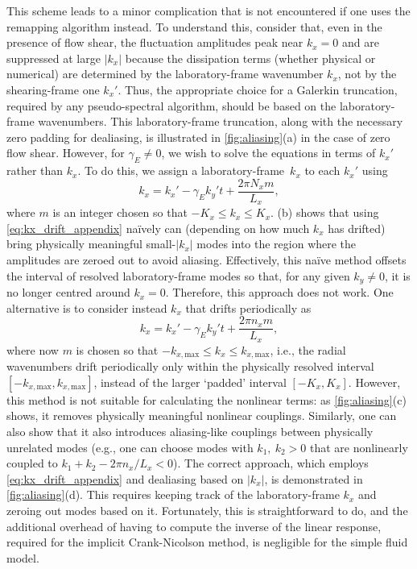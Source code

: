 \documentclass{jpp}
\newcommand{\gammaE}{\gamma_{E}}
\begin{document}
This scheme leads to a minor complication that is not encountered if one uses the remapping algorithm instead. To understand this, consider that, even in the presence of flow shear, the fluctuation amplitudes peak near \(k_x = 0\) and are suppressed at large \(|k_x|\) because the dissipation terms (whether physical or numerical) are determined by the laboratory-frame wavenumber \(k_x\), not by the shearing-frame one \(k_x'\). Thus, the appropriate choice for a Galerkin truncation, required by any pseudo-spectral algorithm, should be based on the laboratory-frame wavenumbers. This laboratory-frame truncation, along with the necessary zero padding for dealiasing, is illustrated in \cref{fig:aliasing}(a) in the case of zero flow shear. However, for \(\gammaE \neq 0\), we wish to solve the equations in terms of \(k_x'\) rather than \(k_x\). To do this, we assign a laboratory-frame~\(k_x\) to each \(k_x'\) using
\begin{equation}
	k_x = k_x' - \gammaE k_y' t + \frac{2\pi N_x m}{L_x},
	\label{eq:kx_drift_appendix}
\end{equation}
where \(m\) is an integer chosen so that \(-K_x \leq k_x \leq K_x\). (b) shows that using \cref{eq:kx_drift_appendix} na\"ively can (depending on how much \(k_x\) has drifted) bring physically meaningful small-\(|k_x|\) modes into the region where the amplitudes are zeroed out to avoid aliasing. Effectively, this na\"ive method offsets the interval of resolved laboratory-frame modes so that, for any given \(k_y \neq 0\), it is no longer centred around \(k_x = 0\). Therefore, this approach does not work. One alternative is to consider instead \(k_x\) that drifts periodically as
\begin{equation}
	k_x = k_x' - \gammaE k_y' t + \frac{2\pi n_x m}{L_x},
	\label{eq:kx_drift_appendix_smallerperiod}
\end{equation}
where now \(m\) is chosen so that \mbox{\(-k_{x, \text{max}} \leq k_x \leq k_{x, \text{max}}\)}, i.e., the radial wavenumbers drift periodically only within the physically resolved interval \([-k_{x, \text{max}}, k_{x, \text{max}}]\), instead of the larger `padded' interval \([-K_x, K_x]\). However, this method is not suitable for calculating the nonlinear terms: as \cref{fig:aliasing}(c) shows, it removes physically meaningful nonlinear couplings. Similarly, one can also show that it also introduces aliasing-like couplings between physically unrelated modes (e.g., one can choose modes with \(k_1, \ k_2 > 0\) that are nonlinearly coupled to \mbox{\(k_1 + k_2 - 2\pi n_x/L_x < 0\)}). The correct approach, which employs \cref{eq:kx_drift_appendix} and dealiasing based on \(|k_x|\), is demonstrated in \cref{fig:aliasing}(d). This requires keeping track of the laboratory-frame \(k_x\) and zeroing out modes based on it. Fortunately, this is straightforward to do, and the additional overhead of having to compute the inverse of the linear response, required for the implicit Crank-Nicolson method, is negligible for the simple fluid model. 
\end{document}
